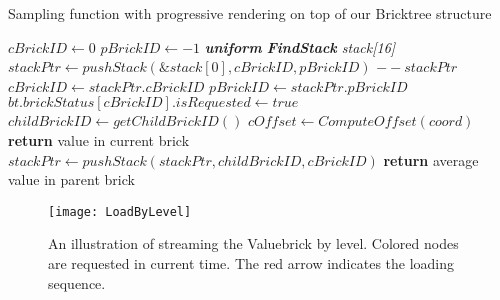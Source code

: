 \begin{algorithm}
	\caption{Sampling function with progressive rendering on top of our Bricktree 
    structure}\label{alg:sample_and_stream}
	\begin{algorithmic}[1]
        	\State $cBrickID\gets \textit{0}$
            \State $pBrickID\gets \textit{$-1$}$
            \State \textit{\textbf{uniform} \textbf{FindStack} stack[16]}
            \State $stackPtr\gets pushStack(\&stack[0], cBrickID, pBrickID)$
            	\State $--stackPtr$
                	\State $cBrickID \gets stackPtr.cBrickID$
                    \State $pBrickID \gets stackPtr.pBrickID$
                    	\State $bt.brickStatus[cBrickID].isRequested \gets true$
                    \EndIf
                    \State
                		\State $childBrickID \gets getChildBrickID()$
            			\State $cOffset \gets ComputeOffset(coord)$
                			\State \textbf{return} value in current brick
               			\Else
                			\State $stackPtr\gets pushStack(stackPtr,childBrickID, cBrickID)$
                		\EndIf
                	\Else
                		\State \textbf{return} average value in parent brick
                	\EndIf
                 \EndIf
            \EndWhile
    	\EndProcedure
	\end{algorithmic}
\end{algorithm}

\begin{figure}[b]
  \centering
    \texttt{[image: LoadByLevel]}
    \caption{\label{fig:loadbylevel}An illustration of streaming the Valuebrick by level. Colored nodes are requested in current time. The red arrow indicates the loading sequence.}
\end{figure}

